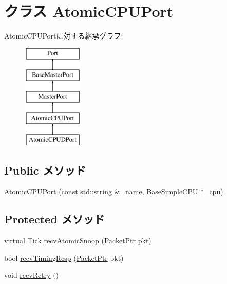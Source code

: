 \hypertarget{classAtomicSimpleCPU_1_1AtomicCPUPort}{
\section{クラス AtomicCPUPort}
\label{classAtomicSimpleCPU_1_1AtomicCPUPort}
}
AtomicCPUPortに対する継承グラフ:\begin{figure}[H]
\begin{center}
\leavevmode
\includegraphics[height=5cm]{classAtomicSimpleCPU_1_1AtomicCPUPort}
\end{center}
\end{figure}
\subsection*{Public メソッド}
\begin{DoxyCompactItemize}
\item 
\hyperlink{classAtomicSimpleCPU_1_1AtomicCPUPort_ab7510fb4487981ef766c2183a23534df}{AtomicCPUPort} (const std::string \&\_\-name, \hyperlink{classBaseSimpleCPU_1_1BaseSimpleCPU}{BaseSimpleCPU} $\ast$\_\-cpu)
\end{DoxyCompactItemize}
\subsection*{Protected メソッド}
\begin{DoxyCompactItemize}
\item 
virtual \hyperlink{base_2types_8hh_a5c8ed81b7d238c9083e1037ba6d61643}{Tick} \hyperlink{classAtomicSimpleCPU_1_1AtomicCPUPort_ae1160d8f94f042aba1dc9a07a72e1e82}{recvAtomicSnoop} (\hyperlink{classPacket}{PacketPtr} pkt)
\item 
bool \hyperlink{classAtomicSimpleCPU_1_1AtomicCPUPort_a482dba5588f4bee43e498875a61e5e0b}{recvTimingResp} (\hyperlink{classPacket}{PacketPtr} pkt)
\item 
void \hyperlink{classAtomicSimpleCPU_1_1AtomicCPUPort_a29cb5a4f98063ce6e9210eacbdb35298}{recvRetry} ()
\end{DoxyCompactItemize}


